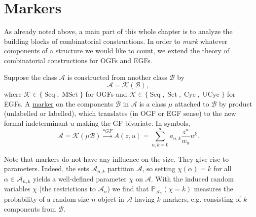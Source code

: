 \section{Markers}

As already noted above, a main part of this whole chapter is to analyze the building blocks of combinatorial constructions.
In order to \textit{mark} whatever components of a structure we would like to count, we extend the theory of combinatorial constructions for OGFs and EGFs.

\begin{defn}
Suppose the class $\mathcal{A}$ is constructed from another class $\mathcal{B}$ by
\begin{equation*}
    \mathcal{A} = \mathcal{K} (\mathcal{B}), 
\end{equation*}
where $\mathcal{K} \in \{ \operatorname{Seq}, \operatorname{MSet} \}$ for OGFs and $\mathcal{K} \in \{ \operatorname{Seq}, \operatorname{Set}, \operatorname{Cyc}, \operatorname{UCyc} \}$ for EGFs.
A \ul{marker} on the components $\mathcal{B}$ in $\mathcal{A}$ is a class $\mu$ attached to $\mathcal{B}$ by product (unlabelled or labelled), which translates (in OGF or EGF sense) to the new formal indeterminant $u$ making the GF bivariate. In symbols, 
\begin{equation*}
    \mathcal{A} = \mathcal{K}(\mu \mathcal{B}) \xrightarrow{*GF} A(z,u) = \sum_{n,k=0}^\infty a_{n,k} \frac{z^n}{w_n} u^k.
\end{equation*}
\end{defn}

Note that markers do not have any influence on the size.
They give rise to parameters. Indeed, the sets $\mathcal{A}_{n,k}$ partition $\mathcal{A}$, so setting $\chi(\alpha) = k$ for all $\alpha \in \mathcal{A}_{n,k}$ yields a well-defined parameter $\chi$ on $\mathcal{A}$.
With the induced random variables $\chi$ (the restrictions to $\mathcal{A}_n$) we find that $\mathbb{P}_{\mathcal{A}_n}(\chi = k)$ measures the probability of a random size-$n$-object in $\mathcal{A}$ having $k$ markers, e.g. consisting of $k$ components from $\mathcal{B}$.





